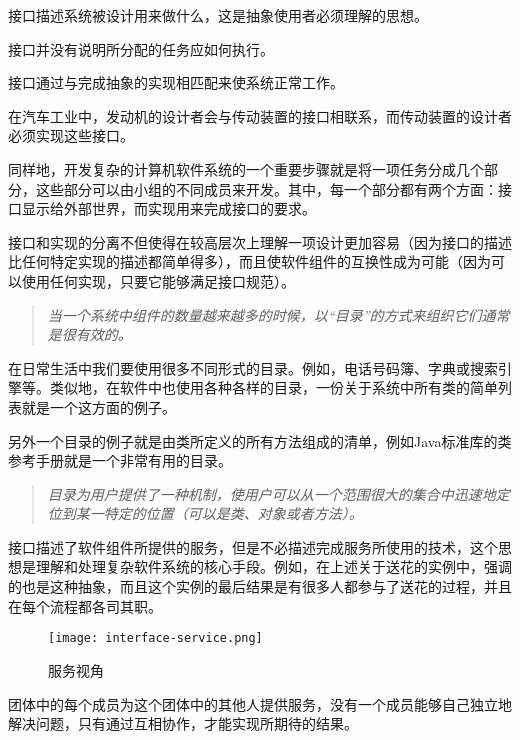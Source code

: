 \begin{compactitem}
\item 接口描述系统被设计用来做什么，这是抽象使用者必须理解的思想。
\item 接口并没有说明所分配的任务应如何执行。
\item 接口通过与完成抽象的实现相匹配来使系统正常工作。
\end{compactitem}

在汽车工业中，发动机的设计者会与传动装置的接口相联系，而传动装置的设计者必须实现这些接口。

同样地，开发复杂的计算机软件系统的一个重要步骤就是将一项任务分成几个部分，这些部分可以由小组的不同成员来开发。其中，每一个部分都有两个方面：接口显示给外部世界，而实现用来完成接口的要求。

接口和实现的分离不但使得在较高层次上理解一项设计更加容易（因为接口的描述比任何特定实现的描述都简单得多），而且使软件组件的互换性成为可能（因为可以使用任何实现，只要它能够满足接口规范）。

\begin{quote}
\textsl{当一个系统中组件的数量越来越多的时候，以“目录”的方式来组织它们通常是很有效的。}
\end{quote}

在日常生活中我们要使用很多不同形式的目录。例如，电话号码簿、字典或搜索引擎等。类似地，在软件中也使用各种各样的目录，一份关于系统中所有类的简单列表就是一个这方面的例子。

另外一个目录的例子就是由类所定义的所有方法组成的清单，例如Java标准库的类参考手册就是一个非常有用的目录。

\begin{quote}
\textsl{目录为用户提供了一种机制，使用户可以从一个范围很大的集合中迅速地定位到某一特定的位置（可以是类、对象或者方法）。}
\end{quote}


接口描述了软件组件所提供的服务，但是不必描述完成服务所使用的技术，这个思想是理解和处理复杂软件系统的核心手段。例如，在上述关于送花的实例中，强调的也是这种抽象，而且这个实例的最后结果是有很多人都参与了送花的过程，并且在每个流程都各司其职。

\begin{figure}[htbp]
\centering
\texttt{[image: interface-service.png]}
\caption{服务视角}
\label{fig:interface-service}
\end{figure}


团体中的每个成员为这个团体中的其他人提供服务，没有一个成员能够自己独立地解决问题，只有通过互相协作，才能实现所期待的结果。




